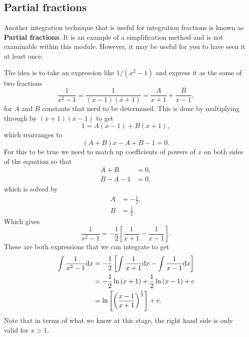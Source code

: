 \subsection*{Partial fractions}
Another integration technique that is useful for integration fractions is known as \textbf{Partial fractions}. It is an example of a simplification method and is not examinable within this module. However, it may be useful for you to have seen it at least once.

The idea is to take an expression like $1/(x^{2}-1)$ and express it as the some of two fractions
\begin{equation*}
\frac{1}{x^{2}-1}=\frac{1}{(x-1)(x+1)}=\frac{A}{x+1}+\frac{B}{x-1},
\end{equation*}
for $A$ and $B$ constants that need to be determined. This is done by multiplying through by $(x+1)(x-1)$ to get
\begin{equation*}
1=A(x-1)+B(x+1),
\end{equation*}
which rearranges to 
\begin{equation*}
(A+B)x-A+B-1=0.
\end{equation*}
For this to be true we need to match up coefficients of powers of $x$ on both sides of the equation so that
\begin{align*}
A+B&=0,\\
B-A-1&=0,
\end{align*}
which is solved by 
\begin{align*}
A&=-\frac{1}{2},\\
B&=\frac{1}{2}.
\end{align*}
Which gives
\begin{equation*}
\frac{1}{x^{2}-1}=-\frac{1}{2}\left[\frac{1}{x+1}-\frac{1}{x-1}\right].
\end{equation*}
These are both expressions that we can integrate to get
\begin{align*}
\int\frac{1}{x^{2}-1}\mathrm{d} x 	&=-\frac{1}{2}\left[\int \frac{1}{x+1}\mathrm{d} x-\int \frac{1}{x-1}\mathrm{d} x\right]\\
					&=-\frac{1}{2}\ln\left(x+1\right)+\frac{1}{2}\ln\left(x-1\right)+c\\
					&=\ln\left[\left(\frac{x-1}{x+1}\right)^{\frac{1}{2}}\right]+c. 
\end{align*}
Note that in terms of what we know at this stage, the right hand side is only valid for $x>1$. 


